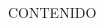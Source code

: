 \begin{frame}
\end{frame}
\begin{frame}
\begin{center}
  \titlepage %
\end{center}
\end{frame}
\begin{frame}{CONTENIDO}
\begin{multicols}{2} %
  \tableofcontents
\end{multicols}


\end{frame}

